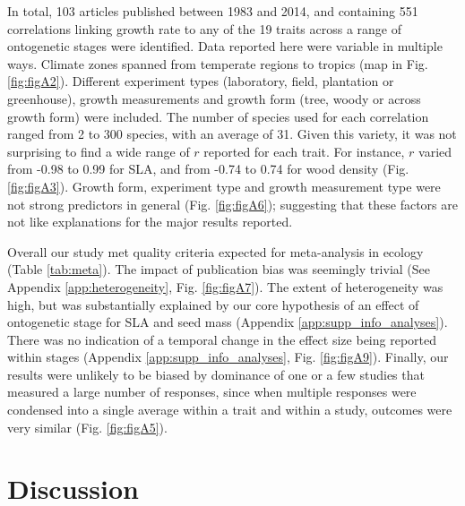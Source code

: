\documentclass[a4paper,11pt]{article}
\begin{document}
In total, 103 articles published between 1983 and 2014, and containing 551 correlations linking growth rate to any of the 19 traits across a range of ontogenetic stages were identified. Data reported here were variable in multiple ways. Climate zones spanned from temperate regions to tropics (map in Fig. \ref{fig:figA2}). Different experiment types (laboratory, field, plantation or greenhouse), growth measurements and growth form (tree, woody or across growth form) were included. The number of species used for each correlation ranged from 2 to 300 species, with an average of 31. Given this variety, it was not surprising to find a wide range of $r$ reported for each trait. For instance, $r$ varied from -0.98 to 0.99 for SLA, and from -0.74 to 0.74 for wood density (Fig. \ref{fig:figA3}). Growth form, experiment type and growth measurement type were not strong predictors in general (Fig. \ref{fig:figA6}); suggesting that these factors are not like explanations for the  major results reported.

Overall our study met quality criteria expected for meta-analysis in ecology (Table \ref{tab:meta}). The impact of publication bias was seemingly trivial (See Appendix \ref{app:heterogeneity}, Fig. \ref{fig:figA7}). The extent of heterogeneity was high, but was substantially explained by our core hypothesis of an effect of ontogenetic stage for SLA and seed mass (Appendix \ref{app:supp_info_analyses}). There was no indication of a temporal change in the effect size being reported within stages (Appendix \ref{app:supp_info_analyses}, Fig. \ref{fig:figA9}). Finally, our results were unlikely to be biased by dominance of one or a few studies that measured a large number of responses, since when multiple responses were condensed into a single average within a trait and within a study, outcomes were very similar (Fig. \ref{fig:figA5}).


\section*{Discussion}\label{discussion}
\end{document}
